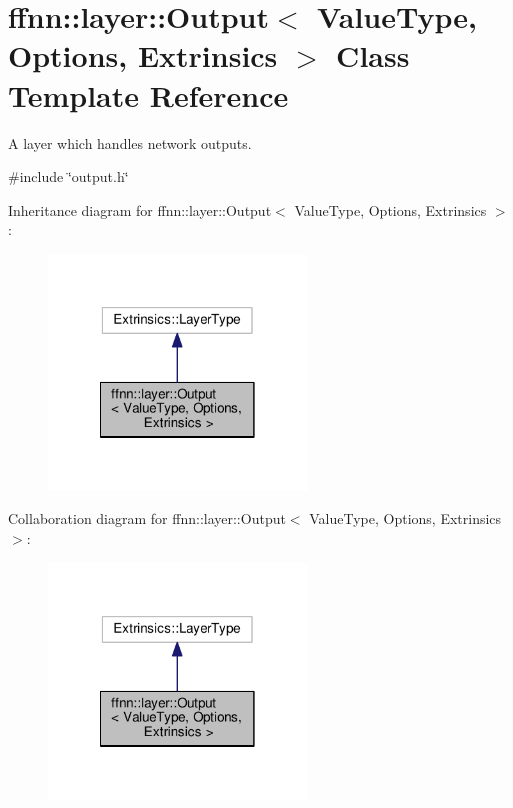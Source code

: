 \hypertarget{classffnn_1_1layer_1_1_output}{\section{ffnn\-:\-:layer\-:\-:Output$<$ Value\-Type, Options, Extrinsics $>$ Class Template Reference}
\label{classffnn_1_1layer_1_1_output}
}


A layer which handles network outputs.  




{\ttfamily \#include \char`\"{}output.\-h\char`\"{}}



Inheritance diagram for ffnn\-:\-:layer\-:\-:Output$<$ Value\-Type, Options, Extrinsics $>$\-:
\nopagebreak
\begin{figure}[H]
\begin{center}
\leavevmode
\includegraphics[width=194pt]{classffnn_1_1layer_1_1_output__inherit__graph}
\end{center}
\end{figure}


Collaboration diagram for ffnn\-:\-:layer\-:\-:Output$<$ Value\-Type, Options, Extrinsics $>$\-:
\nopagebreak
\begin{figure}[H]
\begin{center}
\leavevmode
\includegraphics[width=194pt]{classffnn_1_1layer_1_1_output__coll__graph}
\end{center}
\end{figure}
